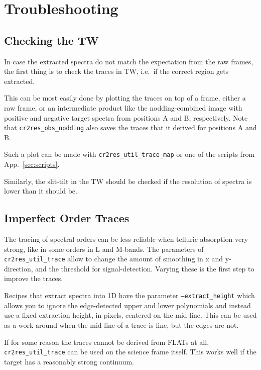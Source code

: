 \section{Troubleshooting}
\label{sec:troubleshooting}



\subsection{Checking the TW}

In case the extracted spectra do not match the expectation from the raw frames,
the first thing is to check the traces in TW, i.e.~if the correct region gets
extracted.

This can be most easily done by plotting the traces on top of a
frame, either a raw frame, or an intermediate product like the nodding-combined
image with positive and negative target spectra from positions A and B,
respectively. Note that \texttt{cr2res\_obs\_nodding} also saves the traces that it derived for positions A and B.

Such a plot can be made with \texttt{cr2res\_util\_trace\_map} or one of the
scripts from App.~\ref{sec:scripts}.

Similarly, the slit-tilt in the TW should be checked if the resolution of
spectra is lower than it should be.


\subsection{Imperfect Order Traces}

The tracing of spectral orders can be less reliable when telluric absorption
very strong, like in some orders in L and M-bands. The parameters of
\texttt{cr2res\_util\_trace} allow to change the amount of smoothing in x and
y-direction, and the threshold for signal-detection. Varying these is the first
step to improve the traces.

Recipes that extract spectra into 1D have the parameter
\texttt{--extract\_height} which allows you to ignore the edge-detected upper
and lower polynomials and instead use a fixed extraction height, in pixels,
centered on the mid-line. This can be used as a work-around when the mid-line of
a trace is fine, but the edges are not.

If for some reason the traces cannot be derived from FLATs at all,
\texttt{cr2res\_util\_trace} can be used on the science frame itself. This works
well if the target has a reasonably strong continuum.

